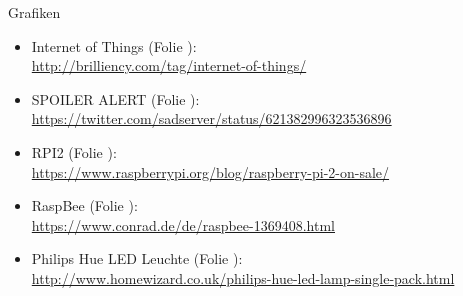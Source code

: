 \documentclass[10pt, compress]{beamer}
\begin{document}
\begin{frame}{Grafiken}
  \begin{itemize}
    \item \small{Internet of Things (Folie \pageref{fig:iot}):}\\
      \footnotesize{
        \url{http://brilliency.com/tag/internet-of-things/}
      }
    \item \small{SPOILER ALERT (Folie \pageref{fig:spoiler}):}\\
      \footnotesize{
        \url{https://twitter.com/sadserver/status/621382996323536896}
      }
    \item \small{RPI2 (Folie \pageref{fig:rpi}):}\\
      \footnotesize{
        \url{https://www.raspberrypi.org/blog/raspberry-pi-2-on-sale/}
      }
    \item \small{RaspBee (Folie \pageref{fig:rbee}):}\\
      \footnotesize{
        \url{https://www.conrad.de/de/raspbee-1369408.html}
      }
    \item \small{Philips Hue LED Leuchte (Folie \pageref{fig:hue}):}\\
      \footnotesize{
        \url{http://www.homewizard.co.uk/philips-hue-led-lamp-single-pack.html}
      }
  \end{itemize}
  
\end{frame}
\end{document}
